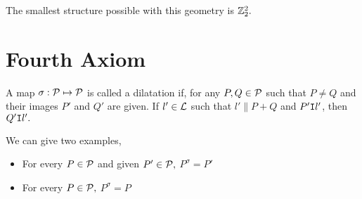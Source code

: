 The smallest structure possible with this geometry is $\mathbb{Z}_2^2.$

\section{Fourth Axiom}
\begin{definition}
    A map $\sigma: \mathcal{P} \mapsto \mathcal{P}$ is called a dilatation if, for any $P,Q \in \mathcal{P}$ such that $P \neq Q$ and their images $P'$ and $Q'$ are given. If $l' \in \mathcal{L}$ such that $l' \parallel P+Q$ and $P' \texttt{I} l'$, then $Q' \texttt{I} l'.$
\end{definition}

We can give two examples,
\begin{itemize}
    \item For every $P \in \mathcal{P}$ and given $P' \in \mathcal{P},$ $P^{\sigma}=P'$
    \item For every $P \in \mathcal{P},$ $P^{\sigma}=P$
\end{itemize}

